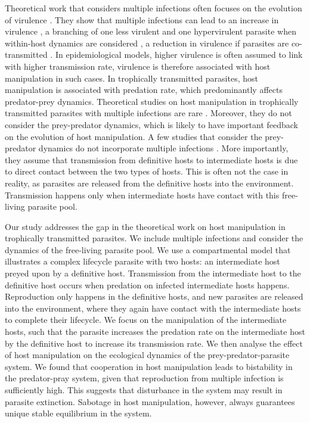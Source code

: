 \documentclass[11pt]{article}
\begin{document}
Theoretical work that considers multiple infections often focuses on the evolution of virulence \citep{vanBaalen1995, Alizon2013, Alizon2008, Choisy2010, Alizon2012}. 
They show that multiple infections can lead to an increase in virulence \citep{vanBaalen1995, Choisy2010}, a branching of one less virulent and one hypervirulent parasite when within-host dynamics are considered \citep{ Alizon2008}, a reduction in virulence if parasites are co-transmitted \citep{Alizon2012}. 
In epidemiological models, higher virulence is often assumed to link with higher transmission rate, virulence is therefore associated with host manipulation in such cases. 
In trophically transmitted parasites, host manipulation is associated with predation rate, which predominantly affects predator-prey dynamics. 
Theoretical studies on host manipulation in trophically transmitted parasites with multiple infections are rare \citep{Parker2003,Vickery2009}. Moreover, they do not consider the prey-predator dynamics, which is likely to have important feedback on the evolution of host manipulation. 
A few studies that consider the prey-predator dynamics do not incorporate multiple infections \citep{Rogawa2018, Iritani2018, Hadeler1989, Fenton2006}. 
More importantly, they assume that transmission from definitive hosts to intermediate hosts is due to direct contact between the two types of hosts. 
This is often not the case in reality, as parasites are released from the definitive hosts into the environment. 
Transmission happens only when intermediate hosts have contact with this free-living parasite pool.


Our study addresses the gap in the theoretical work on host manipulation in trophically transmitted parasites.
We include multiple infections and consider the dynamics of the free-living parasite pool. 
We use a compartmental model that illustrates a complex lifecycle parasite with two hosts: an intermediate host preyed upon by a definitive host. 
Transmission from the intermediate host to the definitive host occurs when predation on infected intermediate hosts happens. 
Reproduction only happens in the definitive hosts, and new parasites are released into the environment, where they again have contact with the intermediate hosts to complete their lifecycle. 
We focus on the manipulation of the intermediate hosts, such that the parasite increases the predation rate on the intermediate host by the definitive host to increase its transmission rate. 
We then analyse the effect of host manipulation on the ecological dynamics of the prey-predator-parasite system. We found that cooperation in host manipulation leads to bistability in the predator-pray system, given that reproduction from multiple infection is sufficiently high. This suggests that disturbance in the system may result in parasite extinction. 
Sabotage in host manipulation, however, always guarantees unique stable equilibrium in the system. 
\end{document}
